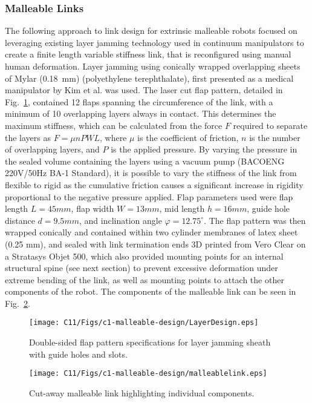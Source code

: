 \subsubsection{Malleable Links}
The following approach to link design for extrinsic malleable robots focused on leveraging existing layer jamming technology used in continuum manipulators to create a finite length variable stiffness link, that is reconfigured using manual human deformation. Layer jamming using conically wrapped overlapping sheets of Mylar\textsuperscript{\textregistered} (0.18~mm) (polyethylene terephthalate), first presented as a medical manipulator by Kim et al. \cite{kim2012design} was used. The laser cut flap pattern, detailed in Fig.~\ref{LayerDesign}, contained 12 flaps spanning the circumference of the link, with a minimum of 10 overlapping layers always in contact. This determines the maximum stiffness, which can be calculated from the force $F$ required to separate the layers as $F=\mu nPWL$, where $\mu$ is the coefficient of friction, $n$ is the number of overlapping layers, and $P$ is the applied pressure. By varying the pressure in the sealed volume containing the layers using a vacuum pump (BACOENG 220V/50Hz BA-1 Standard), it is possible to vary the stiffness of the link from flexible to rigid as the cumulative friction causes a significant increase in rigidity proportional to the negative pressure applied. Flap parameters used were flap length $L=45mm$, flap width $W=13mm$, mid length $h=16mm$, guide hole distance $d=9.5mm$, and inclination angle $\varphi=12.75^\circ$. The flap pattern was then wrapped conically and contained within two cylinder membranes of latex sheet (0.25 mm), and sealed with link termination ends 3D printed from Vero Clear on a Stratasys Objet 500, which also provided mounting points for an internal structural spine (see next section) to prevent excessive deformation under extreme bending of the link, as well as mounting points to attach the other components of the robot. The components of the malleable link can be seen in Fig.~\ref{malleablelink}.

\begin{figure}[t]
    \centering
    \texttt{[image: C11/Figs/c1-malleable-design/LayerDesign.eps]}
    \caption{Double-sided flap pattern specifications for layer jamming sheath with guide holes and slots.}
    \label{LayerDesign}
\end{figure}

\begin{figure}[t!]
    \centering
    \texttt{[image: C11/Figs/c1-malleable-design/malleablelink.eps]}
    \caption{Cut-away malleable link highlighting individual components.}
    \label{malleablelink}
\end{figure}

